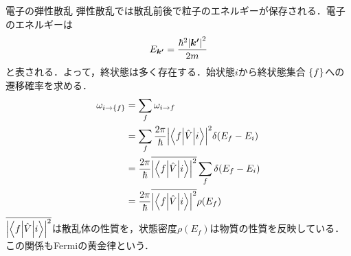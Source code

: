 \documentclass{report}
\begin{document}
  \begin{myex}{電子の弾性散乱}{}
    弾性散乱では散乱前後で粒子のエネルギーが保存される．電子のエネルギーは
    \begin{align}
      E_{\bm{k'}} = \frac{\hbar^2\abs{\bm{k'}}^2}{2m}
    \end{align}
    と表される．よって，終状態は多く存在する．始状態$i$から終状態集合 $\qty{f}$への遷移確率を求める．
    \begin{align}
      \omega_{i \to \qty{f}} &= \sum_{f}\omega_{i \to f}\\
      &= \sum_{f}\frac{2\pi}{\hbar}\abs{\mel**{f}{\hat{V}}{i}}^2\delta(E_f - E_i)\\
      &= \frac{2\pi}{\hbar}\overline{\abs{\mel**{f}{\hat{V}}{i}}^2}\sum_{f}\delta(E_f - E_i)\\
      &= \frac{2\pi}{\hbar}\overline{\abs{\mel**{f}{\hat{V}}{i}}^2}\rho(E_f)
    \end{align}
    $\overline{\abs{\mel**{f}{\hat{V}}{i}}^2}$は散乱体の性質を，状態密度$\rho(E_f)$は物質の性質を反映している．
    この関係もFermiの黄金律という．
  \end{myex}
\end{document}

